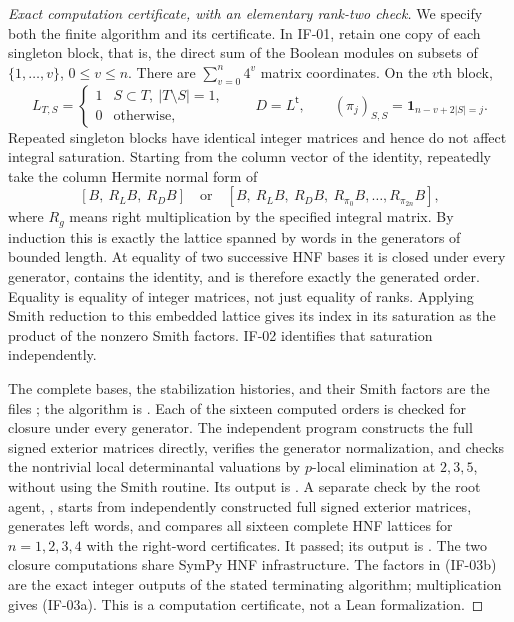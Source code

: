\documentclass[11pt,a4paper]{article}
\theoremstyle{definition}
\theoremstyle{remark}
\begin{document}
\begin{proof}[Exact computation certificate, with an elementary rank-two check]
We specify both the finite algorithm and its certificate. In IF-01,
retain one copy of each singleton block, that is, the direct sum of the
Boolean modules on subsets of $\{1,\ldots,v\}$, $0\leq v\leq n$.
There are $\sum_{v=0}^n4^v$ matrix coordinates. On the $v$th block,
\[
 L_{T,S}=\begin{cases}1&S\subset T,\ |T\setminus S|=1,\\0&\text{otherwise},\end{cases}
 \qquad D=L^{\mathsf t},\qquad
 (\pi_j)_{S,S}=\boldsymbol1_{n-v+2|S|=j}.
\]
Repeated singleton blocks have identical integer matrices and hence do
not affect integral saturation. Starting from the column vector of the
identity, repeatedly take the column Hermite normal form of
\[
 [B,\ R_LB,\ R_DB]
 \quad\text{or}\quad
 [B,\ R_LB,\ R_DB,\ R_{\pi_0}B,\ldots,R_{\pi_{2n}}B],
\]
where $R_g$ means right multiplication by the specified integral matrix.
By induction this is exactly the lattice spanned by words in the
generators of bounded length. At equality of two successive HNF bases
it is closed under every generator, contains the identity, and is
therefore exactly the generated order. Equality is equality of integer
matrices, not just equality of ranks. Applying Smith reduction to this
embedded lattice gives its index in its saturation as the product of the
nonzero Smith factors. IF-02 identifies that saturation independently.

The complete bases, the stabilization histories, and their Smith factors
are the files ; the algorithm is
. Each of the sixteen computed orders
is checked for closure under every generator. The independent program
 constructs the full signed exterior
matrices directly, verifies the generator normalization, and checks the
nontrivial local determinantal valuations by $p$-local elimination at
$2,3,5$, without using the Smith routine. Its output is
. A separate check
by the root agent, ,
starts from independently constructed full signed exterior matrices,
generates left words, and compares all sixteen complete HNF lattices
for $n=1,2,3,4$ with the right-word certificates. It passed; its
output is . The
two closure computations share SymPy HNF infrastructure. The factors in
(IF-03b) are the exact integer outputs of the stated terminating
algorithm; multiplication gives (IF-03a). This is a computation
certificate, not a Lean formalization.


\end{proof}
\end{document}
